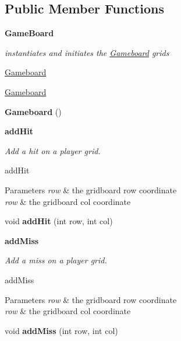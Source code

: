 \subsection*{Public Member Functions}
\begin{Indent}{\bf Game\+Board}\par
{\em instantiates and initiates the \hyperlink{classbattleship_1_1gameboard_1_1Gameboard}{Gameboard} grids

\hyperlink{classbattleship_1_1gameboard_1_1Gameboard}{Gameboard}

\hyperlink{classbattleship_1_1gameboard_1_1Gameboard}{Gameboard} }\begin{DoxyCompactItemize}
\item 
\hypertarget{classbattleship_1_1gameboard_1_1Gameboard_a22e19f74df47266a779b786f7009c2a8}{}{\bfseries Gameboard} ()\label{classbattleship_1_1gameboard_1_1Gameboard_a22e19f74df47266a779b786f7009c2a8}

\end{DoxyCompactItemize}
\end{Indent}
\begin{Indent}{\bf add\+Hit}\par
{\em Add a hit on a player grid.

add\+Hit


\begin{DoxyParams}{Parameters}
{\em row} & the gridboard row coordinate \\
\hline
{\em row} & the gridboard col coordinate \\
\hline
\end{DoxyParams}
}\begin{DoxyCompactItemize}
\item 
\hypertarget{classbattleship_1_1gameboard_1_1Gameboard_ad30e4d7fe41eea60bf568cfcbb55cfc7}{}void {\bfseries add\+Hit} (int row, int col)\label{classbattleship_1_1gameboard_1_1Gameboard_ad30e4d7fe41eea60bf568cfcbb55cfc7}

\end{DoxyCompactItemize}
\end{Indent}
\begin{Indent}{\bf add\+Miss}\par
{\em Add a miss on a player grid.

add\+Miss


\begin{DoxyParams}{Parameters}
{\em row} & the gridboard row coordinate \\
\hline
{\em row} & the gridboard col coordinate \\
\hline
\end{DoxyParams}
}\begin{DoxyCompactItemize}
\item 
\hypertarget{classbattleship_1_1gameboard_1_1Gameboard_a6c218305cee523e002ff7a84372e7e7e}{}void {\bfseries add\+Miss} (int row, int col)\label{classbattleship_1_1gameboard_1_1Gameboard_a6c218305cee523e002ff7a84372e7e7e}

\end{DoxyCompactItemize}
\end{Indent}
